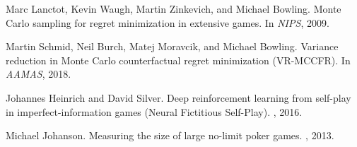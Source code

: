 \documentclass[11pt,a4paper]{article}
\begin{document}
\begin{thebibliography}{99}
Marc Lanctot, Kevin Waugh, Martin Zinkevich, and Michael Bowling.
\newblock Monte Carlo sampling for regret minimization in extensive games.
\newblock In {\em NIPS}, 2009.

Martin Schmid, Neil Burch, Matej Moravcik, and Michael Bowling.
\newblock Variance reduction in Monte Carlo counterfactual regret minimization (VR-MCCFR).
\newblock In {\em AAMAS}, 2018.

Johannes Heinrich and David Silver.
\newblock Deep reinforcement learning from self-play in imperfect-information games (Neural Fictitious Self-Play).
, 2016.

Michael Johanson.
\newblock Measuring the size of large no-limit poker games.
, 2013.

\end{thebibliography}
 
\end{document}
